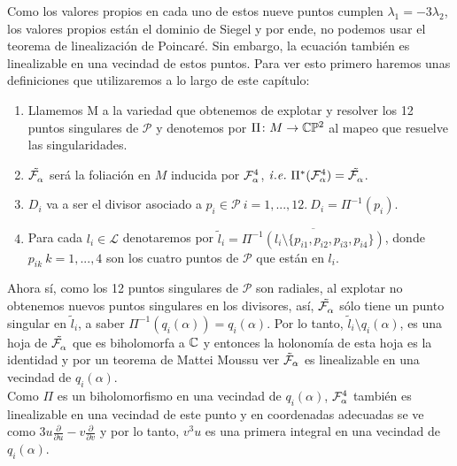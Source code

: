 Como los valores propios en cada uno de estos nueve puntos cumplen $\lambda_{1} = -3\lambda_{2}$, los valores propios están el dominio de Siegel y por ende, no podemos usar el teorema de linealización de Poincaré. Sin embargo, la ecuación también es linealizable en una vecindad de estos puntos. Para ver esto primero haremos unas definiciones que utilizaremos a lo largo de este capítulo:

\begin{Not}
\label{Notimp}
\begin{enumerate}

\*

\item Llamemos M a la variedad que obtenemos de explotar y resolver los 12 puntos singulares de $\mathcal{P}$ y denotemos por $\Pi\colon M \rightarrow \CP$ al mapeo que resuelve las singularidades.

\item $\tilde{\Fol{\alpha}}$ será la foliación en $M$ inducida por $\Fol[4]{\alpha}$,  $\mathit{i.e.} \ \Pi^{*}(\Fol[4]{\alpha}) = \tilde{\Fol{\alpha}}$.

\item $D_{i}$ va a ser el divisor asociado a $p_{i} \in \mathcal{P} \ i=1,...,12. \ D_{i} = \Pi^{-1}(p_{i})$.

\item Para cada $l_{i} \in \mathcal{L}$ denotaremos por $\tilde{l}_{i} = \overline{\Pi^{-1}(l_{i} \setminus \{p_{i1}, p_{i2}, p_{i3}, p_{i4} \})}$, donde $p_{ik} \ k=1,...,4$ son los cuatro puntos de $\mathcal{P}$ que están en $l_{i}$.

\end{enumerate}
\end{Not}
Ahora sí, como los 12 puntos singulares de $\mathcal{P}$ son radiales, al explotar no obtenemos nuevos puntos singulares en los divisores, así, $\tilde{\Fol{\alpha}}$ sólo tiene un punto singular en $\tilde{l}_{i}$, a saber $\Pi^{-1}(q_{i}(\alpha)) = q_{i}(\alpha)$. Por lo tanto, $\tilde{l}_{i}\setminus q_{i}(\alpha)$, es una hoja de $\tilde{\Fol{\alpha}}$ que es biholomorfa a $\C$ y entonces la holonomía de esta hoja es la identidad y por un teorema de Mattei Moussu ver \cite[teorema, 2 p.~482]{Mattei-Moussu} $\tilde{\Foli}_{\alpha}$ es linealizable en una vecindad de $q_{i}(\alpha)$.
\\

Como $\Pi$ es un biholomorfismo en una vecindad de $q_{i}(\alpha)$, $\Fol[4]{\alpha}$ también es linealizable en una vecindad de este punto y en coordenadas adecuadas se ve como $3u\frac{\partial}{\partial u} - v\frac{\partial}{\partial v}$ y por lo tanto, $v^{3}u$ es una primera integral en una vecindad de $q_{i}(\alpha)$.
\\

